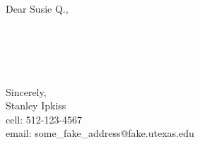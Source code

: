 \pagestyle{CL}
Dear Susie Q.,\\

\lipsum[1]\\

\lipsum[2]\\

\lipsum[3]\\

\lipsum[4]\\

\lipsum[5]\\

Sincerely, \\

Stanley Ipkiss\\
cell: 512-123-4567\\
email: some\_fake\_address@fake.utexas.edu